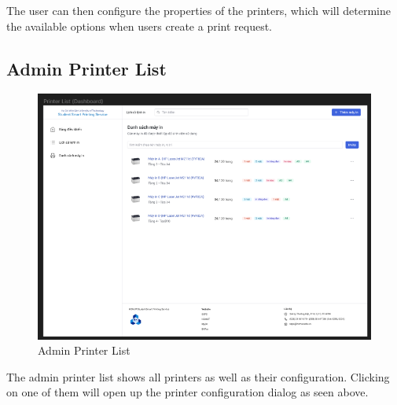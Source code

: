 The user can then configure the properties of the printers, which will determine the available options when users create a print request.

\subsection{Admin Printer List}

\begin{figure}[H]
  \includegraphics[max width=0.9\linewidth]{chapters/5. mvp-wireframe/11. Admin Printer List.png}
  \caption{Admin Printer List}%
\end{figure}

The admin printer list shows all printers as well as their configuration. Clicking on one of them will open up the printer configuration dialog as seen above.